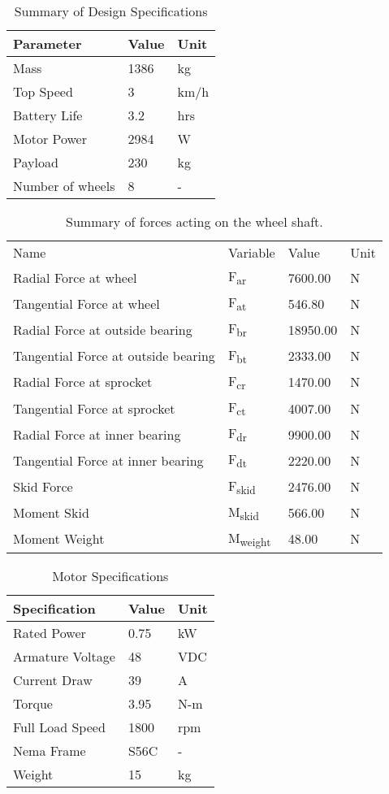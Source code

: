 \begin{table}[htbp]
\centering
\caption{Summary of Design Specifications}
\begin{tabular}{| lll |} \hline
Parameter & Value & Unit \\ \hline
Mass & 1386 & kg \\
Top Speed & 3 & km/h \\
Battery Life & 3.2 & hrs \\
Motor Power & 2984 & W \\
Payload & 230 & kg \\
Number of wheels & 8 & - \\
\end{tabular}
\label{tab:design_spec}
\end{table}


\begin{table}[htbp]
\centering
\caption{Summary of forces acting on the wheel shaft.}
\begin{tabular}{| llll |} \hline
Name & Variable & Value & Unit \\
Radial Force at wheel & F\textsubscript{ar} & 7600.00 & N \\
Tangential Force at wheel & F\textsubscript{at} & 546.80 & N \\
Radial Force at outside bearing & F\textsubscript{br} & 18950.00 & N \\
Tangential Force at outside bearing & F\textsubscript{bt} & 2333.00 & N \\
Radial Force at sprocket & F\textsubscript{cr} & 1470.00 & N \\
Tangential Force at sprocket & F\textsubscript{ct} & 4007.00 & N \\
Radial Force at inner bearing & F\textsubscript{dr} & 9900.00 & N \\
Tangential Force at inner bearing & F\textsubscript{dt} & 2220.00 & N \\
Skid Force & F\textsubscript{skid} & 2476.00 & N \\
Moment Skid & M\textsubscript{skid} & 566.00 & N \\
Moment Weight & M\textsubscript{weight} & 48.00 & N \\
 \end{tabular}
 \label{tab:shaft_calc}
 \end{table}
 
 


  \begin{table}[htbp]
 \centering
 \caption{Motor Specifications}
 \begin{tabular}{| lll |} \hline
 Specification & Value & Unit \\ \hline
Rated Power & 0.75 & kW \\
Armature Voltage & 48 & VDC \\
Current Draw & 39 & A \\
Torque & 3.95 & N-m \\
Full Load Speed & 1800 & rpm \\
Nema Frame & S56C & - \\
Weight & 15 & kg \\ \hline
 \end{tabular}
 \label{tab:motor_spec}
 \end{table}
 
 